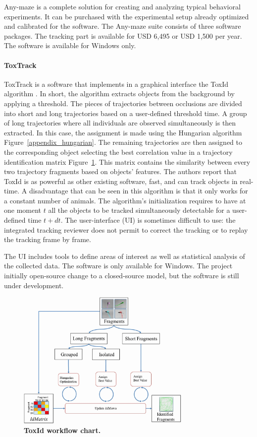     Any-maze is a complete solution for creating and analyzing typical behavioral experiments. It can be purchased with the experimental setup already optimized and calibrated for the software. The Any-maze suite consists of three software packages. The tracking part is available for USD 6,495 or USD 1,500 per year. The software is available for Windows only.

    \paragraph{ToxTrack}
    ToxTrack \cite{rodriguez2018toxtrac} is a software that implements in a graphical interface the ToxId algorithm \cite{rodriguez2017toxid}. In short, the algorithm extracts objects from the background by applying a threshold. The pieces of trajectories between occlusions are divided into short and long trajectories based on a user-defined threshold time. A group of long trajectories where all individuals are observed simultaneously is then extracted. In this case, the assignment is made using the Hungarian algorithm Figure~\ref{appendix_hungarian}. The remaining trajectories are then assigned to the corresponding object selecting the best correlation value in a trajectory identification matrix Figure~\ref{part_1:toxId}. This matrix contains the similarity between every two trajectory fragments based on objects' features.
    The authors report that ToxId is as powerful as other existing software, fast, and can track objects in real-time. A disadvantage that can be seen in this algorithm is that it only works for a constant number of animals. The algorithm's initialization requires to have at one moment $t$ all the objects to be tracked simultaneously detectable for a user-defined time $t+dt$. The user-interface (UI) is sometimes difficult to use: the integrated tracking reviewer does not permit to correct the tracking or to replay the tracking frame by frame.

    The UI includes tools to define areas of interest as well as statistical analysis of the collected data. The software is only available for Windows. The project initially open-source change to a closed-source model, but the software is still under development.

    \begin{figure}[h]
    \centering
    \includegraphics[width=0.75\textwidth]{part_1/assets/toxId.png}
    \caption{{\bf ToxId workflow chart.}}
    \label{part_1:toxId}
    \end{figure}

